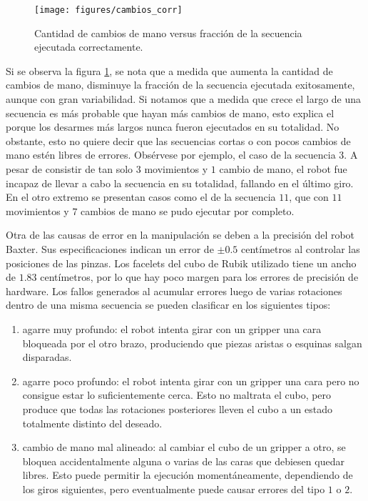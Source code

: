 \begin{figure}[h!]
	\centering
	\texttt{[image: figures/cambios\_corr]}
	\caption{Cantidad de cambios de mano versus fracción de la secuencia ejecutada correctamente.}
	\label{corr}
\end{figure}
Si se observa la figura \ref{corr}, se nota que a medida que aumenta la cantidad de cambios de mano, disminuye la fracción de la secuencia ejecutada exitosamente, aunque con gran variabilidad. Si notamos que a medida que crece el largo de una secuencia es más probable que hayan más cambios de mano, esto explica el porque los desarmes más largos nunca fueron ejecutados en su totalidad. No obstante, esto no quiere decir que las secuencias cortas o con pocos cambios de mano estén libres de errores. Obsérvese por ejemplo, el caso de la secuencia $3$. A pesar de consistir de tan solo $3$ movimientos y $1$ cambio de mano, el robot fue incapaz de llevar a cabo la secuencia en su totalidad, fallando en el último giro. En el otro extremo se presentan casos como el de la secuencia $11$, que con $11$ movimientos y $7$ cambios de mano se pudo ejecutar por completo.

Otra de las causas de error en la manipulación se deben a la precisión del robot Baxter. Sus especificaciones indican un error de $\pm 0.5$ centímetros al controlar las posiciones de las pinzas. Los facelets del cubo de Rubik utilizado tiene un ancho de $1.83$ centímetros, por lo que hay poco margen para los errores de precisión de hardware. Los fallos generados al acumular errores luego de varias rotaciones dentro de una misma secuencia se pueden clasificar en los siguientes tipos:
\begin{enumerate}
	\item agarre muy profundo: el robot intenta girar con un gripper una cara bloqueada por el otro brazo, produciendo que piezas aristas o esquinas salgan disparadas.
	\item agarre poco profundo: el robot intenta girar con un gripper una cara pero no consigue estar lo suficientemente cerca. Esto no maltrata el cubo, pero produce que todas las rotaciones posteriores lleven el cubo a un estado totalmente distinto del deseado.
	\item cambio de mano mal alineado: al cambiar el cubo de un gripper a otro, se bloquea accidentalmente alguna o varias de las caras que debiesen quedar libres. Esto puede permitir la ejecución momentáneamente, dependiendo de los giros siguientes, pero eventualmente puede causar errores del tipo $1$ o $2$.
\end{enumerate}

